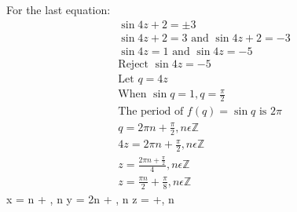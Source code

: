 \documentclass[a4paper,12pt]{article}
\begin{document}
For the last equation:
\begin{equation}
    \begin{split}
        \sin 4z+2 =\pm3 \\
        \sin 4z+2 =3 \text{ and } \sin 4z+2 =-3 \\
        \sin 4z =1 \text{ and } \sin 4z =-5 \\
        \text{Reject } \sin4z = -5 \\
        \text{Let } q=4z \\
        \text{When } \sin q=1, q=\frac{\pi}{2} \\
        \text{The period of } f(q)=\sin q \text{ is } 2\pi \\
        q = 2\pi n+\frac{\pi}{2}, n\epsilon\mathbb{Z} \\
        4z = 2\pi n+\frac{\pi}{2}, n\epsilon\mathbb{Z} \\
        z = \frac{2\pi n+\frac{\pi}{2}}{4}, n\epsilon\mathbb{Z} \\
        z = \frac{\pi n}{2}+\frac{\pi}{8}, n\epsilon\mathbb{Z}
    \end{split}
\end{equation}
\therefore x = \pi n + , n\epsilon{} \newline
 y = 2\pi n + , n\epsilon{} \newline
 z = +, n\epsilon{}
\end{document}
